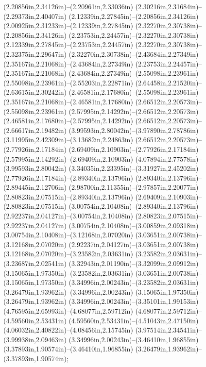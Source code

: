 (2.20856in,2.34126in)--(2.20961in,2.33036in) (2.30216in,2.31684in)--(2.29373in,2.40407in) (2.12339in,2.27845in)--(2.20856in,2.34126in) (2.00925in,2.31233in)--(2.12339in,2.27845in) (2.32270in,2.30738in)--(2.20856in,2.34126in) (2.23753in,2.24457in)--(2.32270in,2.30738in) (2.12339in,2.27845in)--(2.23753in,2.24457in) (2.32270in,2.30738in)--(2.32375in,2.29647in) (2.32270in,2.30738in)--(2.43684in,2.27349in) (2.35167in,2.21068in)--(2.43684in,2.27349in) (2.23753in,2.24457in)--(2.35167in,2.21068in) (2.43684in,2.27349in)--(2.55098in,2.23961in) (2.55098in,2.23961in)--(2.55203in,2.22871in) (2.64458in,2.21520in)--(2.63615in,2.30242in) (2.46581in,2.17680in)--(2.55098in,2.23961in) (2.35167in,2.21068in)--(2.46581in,2.17680in) (2.66512in,2.20573in)--(2.55098in,2.23961in) (2.57995in,2.14292in)--(2.66512in,2.20573in) (2.46581in,2.17680in)--(2.57995in,2.14292in) (2.66512in,2.20573in)--(2.66617in,2.19482in) (3.99593in,2.80042in)--(3.97890in,2.78786in) (3.11995in,2.42309in)--(3.13682in,2.24863in) (2.66512in,2.20573in)--(2.77926in,2.17184in) (2.69409in,2.10903in)--(2.77926in,2.17184in) (2.57995in,2.14292in)--(2.69409in,2.10903in) (4.07894in,2.77578in)--(3.99593in,2.80042in) (3.34035in,2.23395in)--(3.31927in,2.45202in) (2.77926in,2.17184in)--(2.89340in,2.13796in) (2.89340in,2.13796in)--(2.89445in,2.12706in) (2.98700in,2.11355in)--(2.97857in,2.20077in) (2.80823in,2.07515in)--(2.89340in,2.13796in) (2.69409in,2.10903in)--(2.80823in,2.07515in) (3.00754in,2.10408in)--(2.89340in,2.13796in) (2.92237in,2.04127in)--(3.00754in,2.10408in) (2.80823in,2.07515in)--(2.92237in,2.04127in) (3.00754in,2.10408in)--(3.00859in,2.09318in) (3.00754in,2.10408in)--(3.12168in,2.07020in) (3.03651in,2.00738in)--(3.12168in,2.07020in) (2.92237in,2.04127in)--(3.03651in,2.00738in) (3.12168in,2.07020in)--(3.23582in,2.03631in) (3.23582in,2.03631in)--(3.23687in,2.02541in) (3.32943in,2.01190in)--(3.32099in,2.09912in) (3.15065in,1.97350in)--(3.23582in,2.03631in) (3.03651in,2.00738in)--(3.15065in,1.97350in) (3.34996in,2.00243in)--(3.23582in,2.03631in) (3.26479in,1.93962in)--(3.34996in,2.00243in) (3.15065in,1.97350in)--(3.26479in,1.93962in) (3.34996in,2.00243in)--(3.35101in,1.99153in) (4.76595in,2.65993in)--(4.68077in,2.59712in) (4.68077in,2.59712in)--(4.59560in,2.53431in) (4.59560in,2.53431in)--(4.51043in,2.47150in) (4.06032in,2.40822in)--(4.08456in,2.15745in) (3.97514in,2.34541in)--(3.99938in,2.09463in) (3.34996in,2.00243in)--(3.46410in,1.96855in) (3.37893in,1.90574in)--(3.46410in,1.96855in) (3.26479in,1.93962in)--(3.37893in,1.90574in);
